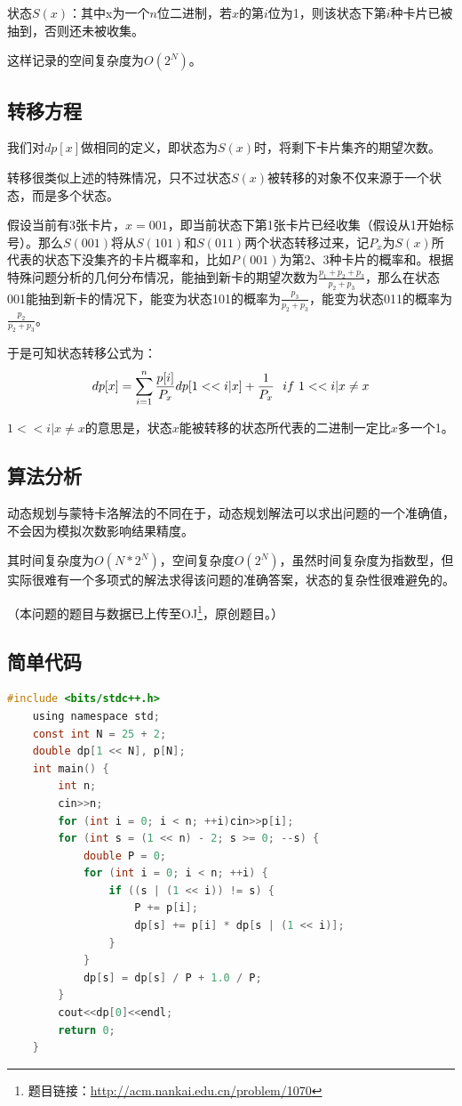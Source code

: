 \documentclass[master]{thesis-uestc}
\begin{document}
状态$S(x)$：其中x为一个$n$位二进制，若$x$的第$i$位为1，则该状态下第$i$种卡片已被抽到，否则还未被收集。

这样记录的空间复杂度为$O(2^N)$。

\subsection{转移方程}

我们对$dp[x]$做相同的定义，即状态为$S(x)$时，将剩下卡片集齐的期望次数。

转移很类似上述的特殊情况，只不过状态$S(x)$被转移的对象不仅来源于一个状态，而是多个状态。

假设当前有3张卡片，$x=001$，即当前状态下第1张卡片已经收集（假设从1开始标号）。那么$S(001)$将从$S(101)$和$S(011)$两个状态转移过来，记$P_x$为$S(x)$所代表的状态下没集齐的卡片概率和，比如$P(001)$为第2、3种卡片的概率和。根据特殊问题分析的几何分布情况，能抽到新卡的期望次数为$\frac{p_1+p_2+p_3}{p_2+p_3}$，那么在状态001能抽到新卡的情况下，能变为状态101的概率为$\frac{p_3}{p_2+p_3}$，能变为状态011的概率为$\frac{p_2}{p_2+p_3}$。

于是可知状态转移公式为：
$$
dp[x]=\sum\limits_{i=1}^n{\frac{p[i]}{P_x}\*dp[1<<i|x]+\frac{1}{P_x}\ \ if\ 1<<i|x\neq x}
$$

$1<<i|x\neq x$的意思是，状态$x$能被转移的状态所代表的二进制一定比$x$多一个1。

\subsection{算法分析}

动态规划与蒙特卡洛解法的不同在于，动态规划解法可以求出问题的一个准确值，不会因为模拟次数影响结果精度。

其时间复杂度为$O(N * 2^N)$，空间复杂度$O(2^N)$，虽然时间复杂度为指数型，但实际很难有一个多项式的解法求得该问题的准确答案，状态的复杂性很难避免的。

（本问题的题目与数据已上传至OJ\footnote{题目链接：\url{http://acm.nankai.edu.cn/problem/1070} }，原创题目。）

\subsection{简单代码}


\begin{lstlisting}[frame=shadowbox,language=C] 
    #include <bits/stdc++.h>
    using namespace std;
    const int N = 25 + 2;
    double dp[1 << N], p[N];
    int main() {
        int n;
        cin>>n;
        for (int i = 0; i < n; ++i)cin>>p[i];
        for (int s = (1 << n) - 2; s >= 0; --s) {
            double P = 0;
            for (int i = 0; i < n; ++i) {
                if ((s | (1 << i)) != s) {
                    P += p[i];
                    dp[s] += p[i] * dp[s | (1 << i)];
                }
            }
            dp[s] = dp[s] / P + 1.0 / P;
        }
        cout<<dp[0]<<endl;
        return 0;
    }
    \end{lstlisting} 
\end{document}
